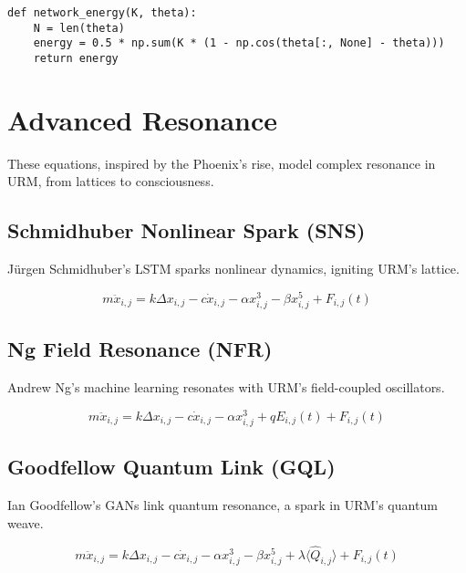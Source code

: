 \documentclass[12pt]{article}
\begin{document}
\begin{lstlisting}[caption={Network Energy}]
def network_energy(K, theta):
    N = len(theta)
    energy = 0.5 * np.sum(K * (1 - np.cos(theta[:, None] - theta)))
    return energy
\end{lstlisting}

\section{Advanced Resonance}

These equations, inspired by the Phoenix’s rise, model complex resonance in URM, from lattices to consciousness.

\subsection{Schmidhuber Nonlinear Spark (SNS)}

Jürgen Schmidhuber’s LSTM sparks nonlinear dynamics, igniting URM’s lattice.

\begin{equation}
    m \ddot{x}_{i,j} = k \Delta x_{i,j} - c \dot{x}_{i,j} - \alpha x_{i,j}^3 - \beta x_{i,j}^5 + F_{i,j}(t)
\end{equation}

\subsection{Ng Field Resonance (NFR)}

Andrew Ng’s machine learning resonates with URM’s field-coupled oscillators.

\begin{equation}
    m \ddot{x}_{i,j} = k \Delta x_{i,j} - c \dot{x}_{i,j} - \alpha x_{i,j}^3 + q E_{i,j}(t) + F_{i,j}(t)
\end{equation}

\subsection{Goodfellow Quantum Link (GQL)}

Ian Goodfellow’s GANs link quantum resonance, a spark in URM’s quantum weave.

\begin{equation}
    m \ddot{x}_{i,j} = k \Delta x_{i,j} - c \dot{x}_{i,j} - \alpha x_{i,j}^3 - \beta x_{i,j}^5 + \lambda \langle \hat{Q}_{i,j} \rangle + F_{i,j}(t)
\end{equation}
\end{document}
